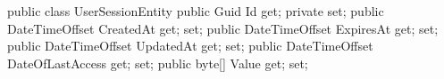 \begin{spverbatim}
    public class UserSessionEntity
        {
        public Guid Id { get; private set; }
        public DateTimeOffset CreatedAt { get; set; }
        public DateTimeOffset ExpiresAt { get; set; }
        public DateTimeOffset UpdatedAt { get; set; }
        public DateTimeOffset DateOfLastAccess { get; set; }
        public byte[] Value { get; set; }
    }
\end{spverbatim}